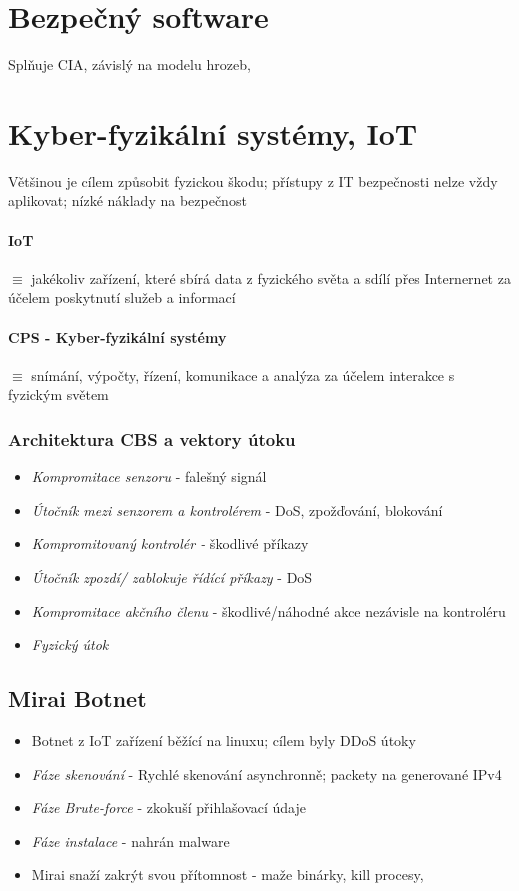 \documentclass[10pt,a4paper]{article}
\begin{document}

\section{Bezpečný software}
Splňuje CIA, závislý na modelu hrozeb, 

\section{Kyber-fyzikální systémy, IoT}
Většinou je cílem způsobit fyzickou škodu; přístupy z IT bezpečnosti nelze vždy aplikovat; nízké náklady na bezpečnost
\paragraph*{IoT} $\equiv$ jakékoliv zařízení, které sbírá data z fyzického světa a sdílí přes Internernet za účelem poskytnutí služeb a informací
\paragraph*{CPS - Kyber-fyzikální systémy} $\equiv$ snímání, výpočty, řízení, komunikace a analýza za účelem interakce s fyzickým světem

\subsubsection*{Architektura CBS a vektory útoku}
\begin{itemize}
    \item \textit{Kompromitace senzoru} - falešný signál
    \item \textit{Útočník mezi senzorem a kontrolérem} - DoS, zpožďování, blokování
    \item \textit{Kompromitovaný kontrolér -} škodlivé příkazy
    \item \textit{Útočník zpozdí/ zablokuje řídící příkazy} - DoS
    \item \textit{Kompromitace akčního členu} - škodlivé/náhodné akce nezávisle na kontroléru
    \item \textit{Fyzický útok}
\end{itemize}


\subsection{Mirai Botnet}
\begin{itemize}
    \item Botnet z IoT zařízení běžící na linuxu; cílem byly DDoS útoky
    \item \textit{Fáze skenování} - Rychlé skenování asynchronně; packety na generované IPv4
    \item \textit{Fáze Brute-force} - zkokuší přihlašovací údaje 
    \item \textit{Fáze instalace} - nahrán malware 
    \item Mirai snaží zakrýt svou přítomnost - maže binárky, kill procesy, 
\end{itemize}
\end{document}
